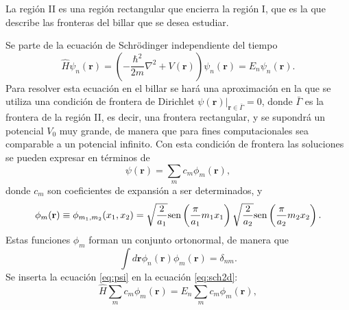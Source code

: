 \documentclass[letterpaper,11pt]{article}
\renewcommand{\vec}[1]{\mathbf{#1}}
\begin{document}
La región II es una región rectangular que encierra la región I, que es la que describe las fronteras del billar que se desea estudiar.

Se parte de la ecuación de Schrödinger independiente del tiempo
\begin{equation} \label{eq:sch2d}
	\hat{H} \psi_n (\vec{r}) = \left( - \frac{\hbar^2}{2 m} \nabla^2 + V(\vec{r}) \right) \psi_n (\vec{r}) = E_n \psi_n (\vec{r}).
\end{equation}
Para resolver esta ecuación en el billar se hará una aproximación en la que se utiliza una condición de frontera de Dirichlet $ \psi (\vec{r}) |_{\vec{r} \in \bar{\Gamma}} = 0$, donde $\bar{\Gamma}$ es la frontera de la región II, es decir, una frontera rectangular, y se supondrá un potencial $V_0$ muy grande, de manera que para fines computacionales sea comparable a un potencial infinito. Con esta condición de frontera las soluciones se pueden expresar en términos de
\begin{equation} \label{eq:psi}
	\psi (\vec{r}) = \sum_m c_m \phi_m (\vec{r}),
\end{equation}
donde $c_m$ son coeficientes de expansión a ser determinados, y
\[
	\phi_m (\vec{r}) \equiv \phi_{m_1,m_2} (x_1, x_2) = \sqrt{\frac{2}{a_1}} \hbox{sen} \left( \frac{\pi}{a_1} m_1 x_1 \right) \sqrt{\frac{2}{a_2}} \hbox{sen} \left( \frac{\pi}{a_2} m_2 x_2 \right).
\]
Estas funciones $\phi_m$ forman un conjunto ortonormal, de manera que
\[
	\int d \vec{r} \phi_n (\vec{r}) \phi_m (\vec{r}) = \delta_{nm}.
\]
Se inserta la ecuación \ref{eq:psi} en la ecuación \ref{eq:sch2d}:
\[
	\hat{H} \sum_m c_m \phi_m (\vec{r}) = E_n \sum_m c_m \phi_m (\vec{r}),
\]
\end{document}
